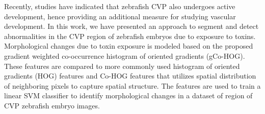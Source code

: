 
Recently, studies have indicated that zebrafish CVP also undergoes active development, hence providing an additional measure for studying vascular development. In this work, we have presented an approach to segment and detect abnormalities in the CVP region of zebrafish embryos due to exposure to toxins.  Morphological changes due to toxin exposure is modeled based on the proposed gradient weighted co-occurrence histogram of oriented gradients (gCo-HOG). These features are compared to more commonly used histogram of oriented gradients (HOG) features and Co-HOG features that utilizes spatial distribution of neighboring pixels to capture spatial structure. The features are used to train a linear SVM classifier to identify morphological changes in a dataset of region of CVP zebrafish embryo images.

